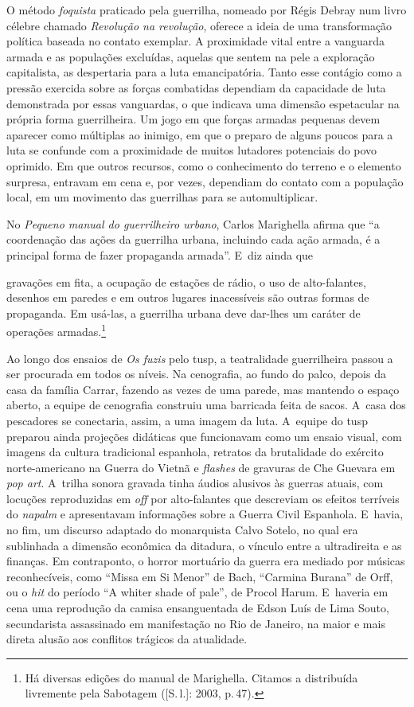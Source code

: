 {O método {\it foquista} praticado pela guerrilha, nomeado por Régis
Debray num livro célebre chamado {\it Revolução na revolução}, oferece a
ideia de uma transformação política baseada no contato exemplar. A
proximidade vital entre a vanguarda armada e as populações excluídas,
aquelas que sentem na pele a exploração capitalista, as despertaria para
a luta emancipatória. Tanto esse contágio como a pressão exercida sobre
as forças combatidas dependiam da capacidade de luta demonstrada por
essas vanguardas, o que indicava uma dimensão espetacular na própria
forma guerrilheira. Um jogo em que forças armadas pequenas devem
aparecer como múltiplas ao inimigo, em que o preparo de alguns poucos
para a luta se confunde com a proximidade de muitos lutadores potenciais
do povo oprimido. Em que outros recursos, como o conhecimento do terreno
e o elemento surpresa, entravam em cena e, por vezes, dependiam do contato
com a população local, em um movimento das guerrilhas para se
automultiplicar.

No {\it Pequeno manual do guerrilheiro urbano}, Carlos Marighella afirma
que “a coordenação das ações da guerrilha urbana, incluindo cada ação
armada, é a principal forma de fazer propaganda armada”. E~diz ainda que

\startblockquote
gravações em fita, a ocupação de estações de rádio, o uso de
alto-falantes, desenhos em paredes e em outros lugares inacessíveis são
outras formas de propaganda. Em usá-las, a guerrilha urbana deve
dar-lhes um caráter de operações armadas.\footnote{Há diversas edições
  do manual de Marighella. Citamos a distribuída livremente pela
  Sabotagem ({[}S.\,l.{]}: 2003, p.\,47).}
\stopblockquote

Ao longo dos ensaios de {\it Os fuzis} pelo {\sc tusp}, a teatralidade
guerrilheira passou a ser procurada em todos os níveis. Na cenografia,
ao fundo do palco, depois da casa da família Carrar, fazendo as vezes de
uma parede, mas mantendo o espaço aberto, a equipe de cenografia
construiu uma barricada feita de sacos. A~casa dos pescadores se
conectaria, assim, a uma imagem da luta. A~equipe do {\sc tusp} preparou ainda
projeções didáticas que funcionavam como um ensaio visual, com imagens
da cultura tradicional espanhola, retratos da brutalidade do exército
norte-americano na Guerra do Vietnã e {\it flashes} de gravuras de Che Guevara
em {\it pop art}. A~trilha sonora gravada tinha áudios alusivos às
guerras atuais, com locuções reproduzidas em {\it off} por alto-falantes
que descreviam os efeitos terríveis do {\it napalm} e apresentavam
informações sobre a Guerra Civil Espanhola. E~havia, no fim, um
discurso adaptado do monarquista Calvo Sotelo, no qual era sublinhada a
dimensão econômica da ditadura, o vínculo entre a ultradireita e as
finanças. Em contraponto, o horror mortuário da guerra era mediado por
músicas reconhecíveis, como “Missa em Si Menor” de Bach,
“Carmina Burana” de Orff, ou o {\it hit} do período “A whiter
shade of pale”, de Procol Harum. E~haveria em cena uma reprodução da
camisa ensanguentada de Edson Luís de Lima Souto, secundarista
assassinado em manifestação no Rio de Janeiro, na maior e mais direta
alusão aos conflitos trágicos da atualidade.

}
